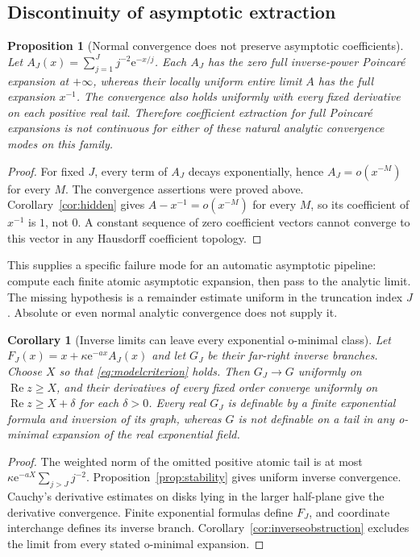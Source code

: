 \documentclass[11pt,a4paper]{article}
\newtheorem{proposition}[theorem]{Proposition}
\newtheorem{corollary}[theorem]{Corollary}
\theoremstyle{definition}
\theoremstyle{remark}
\newcommand{\e}{\mathrm e}
\newcommand{\Rea}{\operatorname{Re}}
\numberwithin{equation}{section}
\begin{document}
\subsection{Discontinuity of asymptotic extraction}

\begin{proposition}[Normal convergence does not preserve asymptotic coefficients]\label{prop:discontinuity}
Let $A_J(x)=\sum_{j=1}^Jj^{-2}\e^{-x/j}$. Each $A_J$ has the zero full inverse-power Poincar\'e expansion at $+\infty$, whereas their locally uniform entire limit $A$ has the full expansion $x^{-1}$. The convergence also holds uniformly with every fixed derivative on each positive real tail. Therefore coefficient extraction for full Poincar\'e expansions is not continuous for either of these natural analytic convergence modes on this family.
\end{proposition}
\begin{proof}
For fixed $J$, every term of $A_J$ decays exponentially, hence $A_J=o(x^{-M})$ for every $M$. The convergence assertions were proved above. Corollary~\ref{cor:hidden} gives $A-x^{-1}=o(x^{-M})$ for every $M$, so its coefficient of $x^{-1}$ is $1$, not $0$. A constant sequence of zero coefficient vectors cannot converge to this vector in any Hausdorff coefficient topology.
\end{proof}

This supplies a specific failure mode for an automatic asymptotic pipeline: compute each finite atomic asymptotic expansion, then pass to the analytic limit. The missing hypothesis is a remainder estimate uniform in the truncation index $J$. Absolute or even normal analytic convergence does not supply it.

\begin{corollary}[Inverse limits can leave every exponential o-minimal class]\label{cor:inverselimits}
Let $F_J(x)=x+\kappa\e^{-ax}A_J(x)$ and let $G_J$ be their far-right inverse branches. Choose $X$ so that \eqref{eq:modelcriterion} holds. Then $G_J\to G$ uniformly on $\Rea z\ge X$, and their derivatives of every fixed order converge uniformly on $\Rea z\ge X+\delta$ for each $\delta>0$. Every real $G_J$ is definable by a finite exponential formula and inversion of its graph, whereas $G$ is not definable on a tail in any o-minimal expansion of the real exponential field.
\end{corollary}
\begin{proof}
The weighted norm of the omitted positive atomic tail is at most $\kappa\e^{-aX}\sum_{j>J}j^{-2}$. Proposition~\ref{prop:stability} gives uniform inverse convergence. Cauchy's derivative estimates on disks lying in the larger half-plane give the derivative convergence. Finite exponential formulas define $F_J$, and coordinate interchange defines its inverse branch. Corollary~\ref{cor:inverseobstruction} excludes the limit from every stated o-minimal expansion.
\end{proof}
\end{document}
